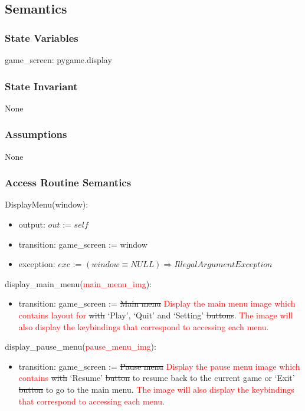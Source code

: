 \documentclass[12pt]{article}
\begin{document}
\subsection* {Semantics}

\subsubsection* {State Variables}

game\_screen: pygame.display

\subsubsection* {State Invariant}

None

\subsubsection* {Assumptions}

None

\subsubsection* {Access Routine Semantics}

DisplayMenu(window):
\begin{itemize}
    \item output: $out$ := $self$
    \item transition: game\_screen := window
    \item exception: $exc$ := $(window \equiv NULL) \Rightarrow IllegalArgumentException $
\end{itemize}

\noindent display\_main\_menu(\textcolor{red}{main\_menu\_img}):
\begin{itemize}
    \item transition: game\_screen := \sout{Main menu} \textcolor{red}{Display the main menu image which contains layout for} \sout{with} `Play', `Quit' and `Setting' \sout{buttons}. \textcolor{red}{The image will also display the keybindings that correspond to accessing each menu. }
\end{itemize}

\noindent display\_pause\_menu(\textcolor{red}{pause\_menu\_img}):
\begin{itemize}
    \item transition: game\_screen := \sout{Pause menu} \textcolor{red}{Display the pause menu image which contains} \sout{with} `Resume' \sout{button} to resume back to the current game or `Exit' \sout{button} to go to the main menu. \textcolor{red}{The image will also display the keybindings that correspond to accessing each menu. }
\end{itemize}
\end{document}
